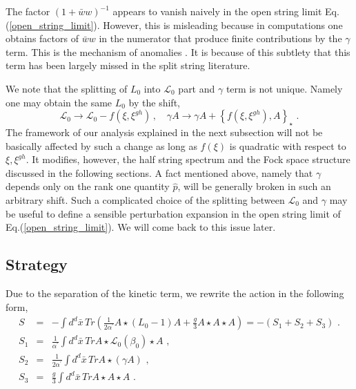 \documentclass[a4paper,aps,preprint,nofootinbib,eqsecnum]{revtex4}
\begin{document}
The factor $(1+\bar{w}w)^{-1}$ appears to vanish naively in the open string
limit Eq.(\ref{open_string_limit}). However, this is misleading because in
computations one obtains factors of $\bar{w}w$ in the numerator that produce
finite contributions by the $\gamma $ term. This is the mechanism of
anomalies \cite{BM1}. It is because of this subtlety that this term has been
largely missed in the split string literature.

We note that the splitting of $L_{0}$ into ${\mathcal{L}_{0}}$ part and $%
\gamma $ term is not unique. Namely one may obtain the same $L_{0}$ by the
shift,
\begin{equation}
{\mathcal{L}_{0}}\rightarrow {\mathcal{L}_{0}}-f(\xi ,\xi ^{gh})\,,\quad
\gamma A\rightarrow \gamma A+\left\{ f(\xi ,\xi ^{gh}),A\right\} _{\star
}\,\,.
\end{equation}%
The framework of our analysis explained in the next subsection will not be
basically affected by such a change as long as $f(\xi )$ is quadratic with
respect to $\xi ,\xi ^{gh}$. It modifies, however, the half string spectrum
and the Fock space structure discussed in the following sections. A fact
mentioned above, namely that $\gamma $ depends only on the rank one quantity
$\hat{p}$, will be generally broken in such an arbitrary shift. Such a
complicated choice of the splitting between ${\mathcal{L}_{0}}$ and $\gamma $
may be useful to define a sensible perturbation expansion in the open string
limit of Eq.(\ref{open_string_limit}). We will come back to this issue later.

\subsection{Strategy}

Due to the separation of the kinetic term, we rewrite the action in the
following form,
\begin{eqnarray}
S &=&-\int d^{d}\bar{x}\,Tr\left( \frac{1}{2{\alpha ^{\prime }}}A\star
(L_{0}-1)A+\frac{g}{3}A\star A\star A\right) =-\left(
S_{1}+S_{2}+S_{3}\right) \,\,. \\
S_{1} &=&\frac{1}{{\alpha ^{\prime }}}\int d^{d}\bar{x}\,TrA\star {\mathcal{L%
}_{0}}(\beta _{0})\star A\,\,, \\
S_{2} &=&\frac{1}{2{\alpha ^{\prime }}}\int d^{d}\bar{x}\,TrA\star (\gamma
A)\,\,, \\
S_{3} &=&\frac{g}{3}\int d^{d}\bar{x}\,TrA\star A\star A\,\,.
\end{eqnarray}
\end{document}
